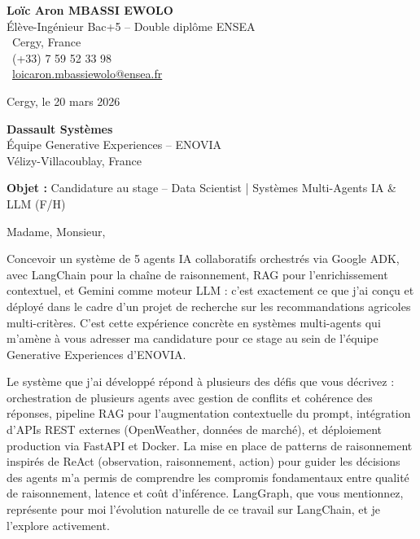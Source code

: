 \documentclass[a4paper,11pt]{article}
\begin{document}
\noindent
\begin{minipage}[t]{0.5\textwidth}
    \textbf{Loïc Aron MBASSI EWOLO}\\
    Élève-Ingénieur Bac+5 -- Double diplôme ENSEA\\[3pt]
    \faMapMarker\ Cergy, France\\
    \faPhone\ (+33) 7 59 52 33 98\\
    \faEnvelope\ \href{mailto:loicaron.mbassiewolo@ensea.fr}{loicaron.mbassiewolo@ensea.fr}
\end{minipage}
\hfill
\begin{minipage}[t]{0.4\textwidth}
    \raggedleft
    Cergy, le 20 mars 2026
\end{minipage}

\vspace{1.2cm}

\hfill
\begin{minipage}[t]{0.5\textwidth}
    \raggedleft
    \textbf{Dassault Systèmes}\\
    Équipe Generative Experiences -- ENOVIA\\
    Vélizy-Villacoublay, France
\end{minipage}

\vspace{1cm}

\noindent\textbf{Objet :} Candidature au stage -- Data Scientist | Systèmes Multi-Agents IA \& LLM (F/H)

\vspace{0.8cm}

Madame, Monsieur,

Concevoir un système de 5 agents IA collaboratifs orchestrés via Google ADK, avec LangChain pour la chaîne de raisonnement, RAG pour l'enrichissement contextuel, et Gemini comme moteur LLM : c'est exactement ce que j'ai conçu et déployé dans le cadre d'un projet de recherche sur les recommandations agricoles multi-critères. C'est cette expérience concrète en systèmes multi-agents qui m'amène à vous adresser ma candidature pour ce stage au sein de l'équipe Generative Experiences d'ENOVIA.

Le système que j'ai développé répond à plusieurs des défis que vous décrivez : orchestration de plusieurs agents avec gestion de conflits et cohérence des réponses, pipeline RAG pour l'augmentation contextuelle du prompt, intégration d'APIs REST externes (OpenWeather, données de marché), et déploiement production via FastAPI et Docker. La mise en place de patterns de raisonnement inspirés de ReAct (observation, raisonnement, action) pour guider les décisions des agents m'a permis de comprendre les compromis fondamentaux entre qualité de raisonnement, latence et coût d'inférence. LangGraph, que vous mentionnez, représente pour moi l'évolution naturelle de ce travail sur LangChain, et je l'explore activement.
\end{document}

